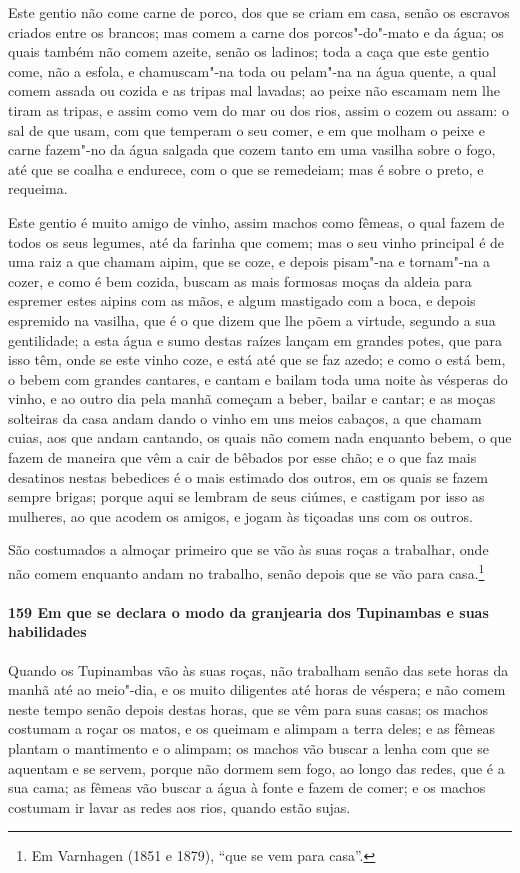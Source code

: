 \begin{linenumbers}
Este gentio não come carne de porco, dos que se criam em casa, senão os escravos criados
entre os brancos; mas comem a carne dos porcos"-do"-mato e da água; os quais também não
comem azeite, senão os ladinos; toda a caça que este gentio come, não a esfola, e
chamuscam"-na toda ou pelam"-na na água quente, a qual comem assada ou cozida e as tripas
mal lavadas; ao peixe não escamam nem lhe tiram as tripas, e assim como vem do mar ou dos
rios, assim o cozem ou assam: o sal de que usam, com que temperam o seu comer, e em que
molham o peixe e carne fazem"-no da água salgada que cozem tanto em uma vasilha sobre o
fogo, até que se coalha e endurece, com o que se remedeiam; mas é sobre o preto, e
requeima.

Este gentio é muito amigo de vinho, assim machos como fêmeas, o qual fazem de todos os
seus legumes, até da farinha que comem; mas o seu vinho principal é de uma raiz a que
chamam aipim, que se coze, e depois pisam"-na e tornam"-na a cozer, e como é bem cozida,
buscam as mais formosas moças da aldeia para espremer estes aipins com as mãos, e algum
mastigado com a boca, e depois espremido na vasilha, que é o que dizem que lhe põem a
virtude, segundo a sua gentilidade; a esta água e sumo destas raízes lançam em grandes
potes, que para isso têm, onde se este vinho coze, e está até que se faz azedo; e como o
está bem, o bebem com grandes cantares, e cantam e bailam toda uma noite às vésperas do
vinho, e ao outro dia pela manhã começam a beber, bailar e cantar; e as moças solteiras da
casa andam dando o vinho em uns meios cabaços, a que chamam cuias, aos que andam cantando,
os quais não comem nada enquanto bebem, o que fazem de maneira que vêm a cair de bêbados
por esse chão; e o que faz mais desatinos nestas bebedices é o mais estimado dos outros,
em os quais se fazem sempre brigas; porque aqui se lembram de seus ciúmes, e castigam por
isso as mulheres, ao que acodem os amigos, e jogam às tiçoadas uns com os outros.

São costumados a almoçar primeiro que se vão às suas roças a trabalhar, onde não comem
enquanto andam no trabalho, senão depois que se vão para casa.\footnote{ Em Varnhagen
(1851 e 1879), ``que se vem para casa''.}

\paragraph{159 Em que se declara o modo da granjearia dos Tupinambas e suas habilidades}\quad
Quando os Tupinambas vão às suas roças, não trabalham senão das sete horas da manhã até ao
meio"-dia, e os muito diligentes até horas de véspera; e não comem neste tempo senão depois
destas horas, que se vêm para suas casas; os machos costumam a roçar os matos, e os
queimam e alimpam a terra deles; e as fêmeas plantam o mantimento e o alimpam; os machos
vão buscar a lenha com que se aquentam e se servem, porque não dormem sem fogo, ao longo
das redes, que é a sua cama; as fêmeas vão buscar a água à fonte e fazem de comer; e os
machos costumam ir lavar as redes aos rios, quando estão sujas.


\end{linenumbers}
